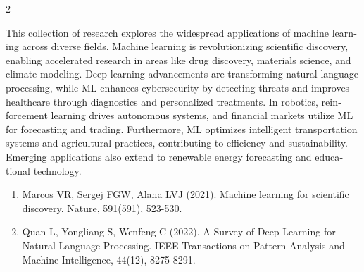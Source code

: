 \documentclass[twoside]{article}
\newcommand{\timesfont}{\rmfamily}
\begin{document}
\begin{multicols}{2}
\timesfont
\begin{otherlanguage}{english}
This collection of research explores the widespread applications of machine learning across diverse fields. Machine learning is revolutionizing scientific discovery, enabling accelerated research in areas like drug discovery, materials science, and climate modeling. Deep learning advancements are transforming natural language processing, while ML enhances cybersecurity by detecting threats and improves healthcare through diagnostics and personalized treatments. In robotics, reinforcement learning drives autonomous systems, and financial markets utilize ML for forecasting and trading. Furthermore, ML optimizes intelligent transportation systems and agricultural practices, contributing to efficiency and sustainability. Emerging applications also extend to renewable energy forecasting and educational technology.
\end{otherlanguage}

\vspace{8pt}
\par\vspace{2pt}

\timesfont
\fontsize{10pt}{10.5pt}\selectfont
\hypersetup{urlcolor=color_29791} %
\begin{enumerate}[label=\textbf{\arabic*.}, leftmargin=14pt, itemsep=5pt, parsep=2pt]
    \item Marcos VR, Sergej FGW, Alana LVJ (2021). Machine learning for scientific discovery. Nature, 591(591), 523-530.    \item Quan L, Yongliang S, Wenfeng C (2022). A Survey of Deep Learning for Natural Language Processing. IEEE Transactions on Pattern Analysis and Machine Intelligence, 44(12), 8275-8291.\end{enumerate}

\end{multicols}
\end{document}
